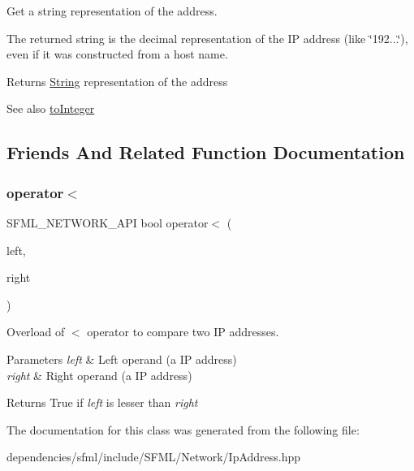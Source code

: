 Get a string representation of the address. 

The returned string is the decimal representation of the IP address (like \char`\"{}192...\char`\"{}), even if it was constructed from a host name.

\begin{DoxyReturn}{Returns}
\hyperlink{classsf_1_1_string}{String} representation of the address
\end{DoxyReturn}
\begin{DoxySeeAlso}{See also}
\hyperlink{classsf_1_1_ip_address_ae7911c5ea9562f9602c3e29cd54b15e9}{to\+Integer} 
\end{DoxySeeAlso}


\subsection{Friends And Related Function Documentation}
\mbox{\label{classsf_1_1_ip_address_a1c4ae6b26e9df765ca57d2715e9a7885}} 
\subsubsection{\texorpdfstring{operator$<$}{operator<}}
{\footnotesize\ttfamily S\+F\+M\+L\+\_\+\+N\+E\+T\+W\+O\+R\+K\+\_\+\+A\+PI bool operator$<$ (\begin{DoxyParamCaption}\item[{const \hyperlink{classsf_1_1_ip_address}{Ip\+Address} \&}]{left,  }\item[{const \hyperlink{classsf_1_1_ip_address}{Ip\+Address} \&}]{right }\end{DoxyParamCaption})\hspace{0.3cm}{\ttfamily [friend]}}



Overload of $<$ operator to compare two IP addresses. 


\begin{DoxyParams}{Parameters}
{\em left} & Left operand (a IP address) \\
\hline
{\em right} & Right operand (a IP address)\\
\hline
\end{DoxyParams}
\begin{DoxyReturn}{Returns}
True if {\itshape left} is lesser than {\itshape right} 
\end{DoxyReturn}


The documentation for this class was generated from the following file\+:\begin{DoxyCompactItemize}
\item 
dependencies/sfml/include/\+S\+F\+M\+L/\+Network/Ip\+Address.\+hpp\end{DoxyCompactItemize}
